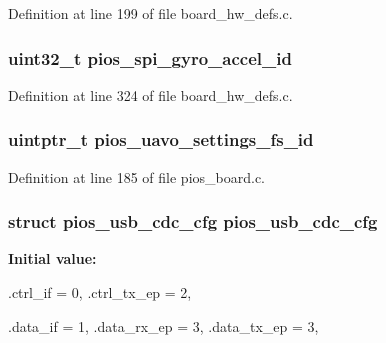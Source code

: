 \-Definition at line 199 of file board\-\_\-hw\-\_\-defs.\-c.

\hypertarget{group___quanton_ga865a74a9b199b06803aec5b185719d6d}{
\subsubsection[{pios\-\_\-spi\-\_\-gyro\-\_\-accel\-\_\-id}]{\setlength{\rightskip}{0pt plus 5cm}uint32\-\_\-t {\bf pios\-\_\-spi\-\_\-gyro\-\_\-accel\-\_\-id}}}\label{group___quanton_ga865a74a9b199b06803aec5b185719d6d}


\-Definition at line 324 of file board\-\_\-hw\-\_\-defs.\-c.

\hypertarget{group___quanton_gab060f441dd600b08386c0ca1b487217a}{
\subsubsection[{pios\-\_\-uavo\-\_\-settings\-\_\-fs\-\_\-id}]{\setlength{\rightskip}{0pt plus 5cm}uintptr\-\_\-t {\bf pios\-\_\-uavo\-\_\-settings\-\_\-fs\-\_\-id}}}\label{group___quanton_gab060f441dd600b08386c0ca1b487217a}


\-Definition at line 185 of file pios\-\_\-board.\-c.

\hypertarget{group___quanton_ga05cc3e449d417c7f9097d2659e6f5ca3}{
\subsubsection[{pios\-\_\-usb\-\_\-cdc\-\_\-cfg}]{\setlength{\rightskip}{0pt plus 5cm}struct {\bf pios\-\_\-usb\-\_\-cdc\-\_\-cfg} {\bf pios\-\_\-usb\-\_\-cdc\-\_\-cfg}}}\label{group___quanton_ga05cc3e449d417c7f9097d2659e6f5ca3}
{\bfseries \-Initial value\-:}
\begin{DoxyCode}
 {
        .ctrl_if = 0,
        .ctrl_tx_ep = 2,

        .data_if = 1,
        .data_rx_ep = 3,
        .data_tx_ep = 3,
}
\end{DoxyCode}


